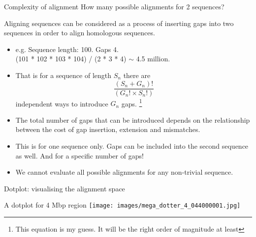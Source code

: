 \documentclass[pdf]{beamer}
\begin{document}
\begin{frame}{Complexity of alignment}
  How many possible alignments for 2 sequences?

  Aligning sequences can be considered as a process of inserting gaps into two
  sequences in order to align homologous sequences.
  \pause
  \begin{itemize}
    \item e.g. Sequence length: 100. Gaps 4.\\
      (101 * 102 * 103 * 104) / (2 * 3 * 4) $\sim$ 4.5 million.
      \pause
    \item That is for a sequence of length $S_n$ there are
      $$ \frac{(S_n + G_n)!}{(G_n! \times S_n!)} $$
      independent ways to introduce $G_n$ gaps.
      \footnote{This equation is my guess. It will be the right order of
        magnitude at least}
      \pause
    \item The total number of gaps that can be introduced depends
      on the relationship between the cost of gap insertion, extension and mismatches.
      \pause
    \item This is for one sequence only. Gaps can be included into the second
      sequence as well. And for a specific number of gaps!
    \item We cannot evaluate all possible alignments for any non-trivial sequence.
  \end{itemize}
    
\end{frame}

\begin{frame}{Dotplot: visualising the alignment space}
  \begin{figure}[ht]
    \begin{tikzpicture}[scale=0.5]
      
    \end{tikzpicture}
  \end{figure}

\end{frame}

\begin{frame}{A dotplot for 4 Mbp region}
  \flushleft
    \texttt{[image: images/mega\_dotter\_4\_044000001.jpg]}
    \hfill
\end{frame}
\end{document}
